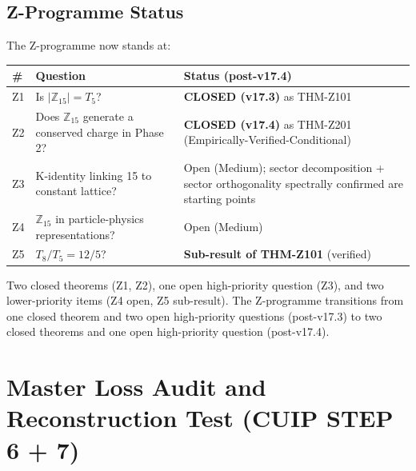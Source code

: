 \documentclass[12pt, a4paper]{article}
\begin{document}
\subsection{Z-Programme Status}

The Z-programme now stands at:

{\small
\renewcommand{\arraystretch}{1.30}
\begin{center}
\begin{tabular}{p{0.6cm} p{6.0cm} p{6.5cm}}
\toprule
\textbf{\#} & \textbf{Question} & \textbf{Status (post-v17.4)} \\
\midrule
Z1 & Is $|\mathbb{Z}_{15}| = T_5$? &
  \textbf{CLOSED (v17.3)} as THM-Z101 \\
Z2 & Does $\mathbb{Z}_{15}$ generate a conserved charge in Phase 2? &
  \textbf{CLOSED (v17.4)} as THM-Z201 (Empirically-Verified-Conditional) \\
Z3 & K-identity linking 15 to constant lattice? &
  Open (Medium); sector decomposition + sector orthogonality
  spectrally confirmed are starting points \\
Z4 & $\mathbb{Z}_{15}$ in particle-physics representations? &
  Open (Medium) \\
Z5 & $T_8/T_5 = 12/5$? &
  \textbf{Sub-result of THM-Z101} (verified) \\
\bottomrule
\end{tabular}
\end{center}
}

Two closed theorems (Z1, Z2), one open high-priority question (Z3),
and two lower-priority items (Z4 open, Z5 sub-result). The
Z-programme transitions from one closed theorem and two open
high-priority questions (post-v17.3) to two closed theorems and one
open high-priority question (post-v17.4).

\section{Master Loss Audit and Reconstruction Test (CUIP STEP 6 + 7)}
\label{sec:Z2-loss-audit}
\end{document}
